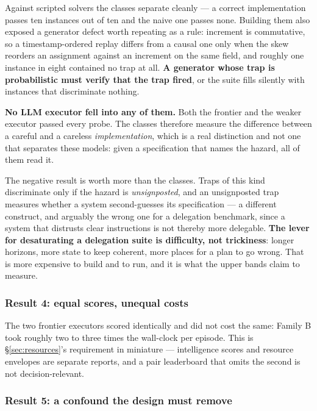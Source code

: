 \documentclass[11pt]{article}
\theoremstyle{definition}
\begin{document}
Against scripted solvers the classes separate cleanly --- a correct
implementation passes ten instances out of ten and the naive one passes none.
Building them also exposed a generator defect worth repeating as a rule:
increment is commutative, so a timestamp-ordered replay differs from a causal one
only when the skew reorders an assignment against an increment on the same field,
and roughly one instance in eight contained no trap at all. \textbf{A generator
whose trap is probabilistic must verify that the trap fired}, or the suite fills
silently with instances that discriminate nothing.

\textbf{No LLM executor fell into any of them.} Both the frontier and the weaker
executor passed every probe. The classes therefore measure the difference between
a careful and a careless \emph{implementation}, which is a real distinction and
not one that separates these models: given a specification that names the hazard,
all of them read it.

The negative result is worth more than the classes. Traps of this kind
discriminate only if the hazard is \emph{unsignposted}, and an unsignposted trap
measures whether a system second-guesses its specification --- a different
construct, and arguably the wrong one for a delegation benchmark, since a system
that distrusts clear instructions is not thereby more delegable. \textbf{The
lever for desaturating a delegation suite is difficulty, not trickiness}: longer
horizons, more state to keep coherent, more places for a plan to go wrong. That
is more expensive to build and to run, and it is what the upper bands claim to
measure.

\subsubsection{Result 4: equal scores, unequal costs}

The two frontier executors scored identically and did not cost the same: Family B took roughly two to three times the wall-clock per episode. This is \S\ref{sec:resources}'s requirement in miniature --- intelligence scores and resource envelopes are separate reports, and a pair leaderboard that omits the second is not decision-relevant.

\subsubsection{Result 5: a confound the design must remove}\label{sec:confound}
\end{document}
